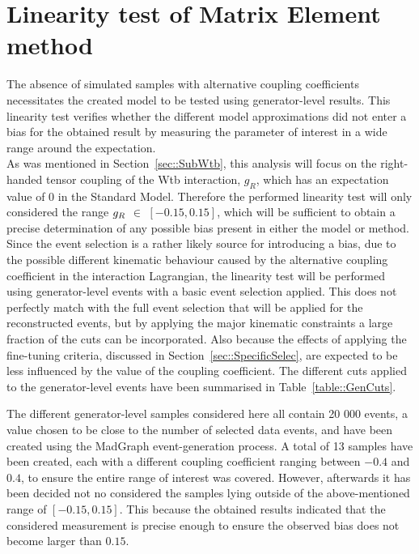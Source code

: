 \section{Linearity test of Matrix Element method}\label{sec::CalibCurve}

The absence of simulated samples with alternative coupling coefficients necessitates the created model to be tested using generator-level results. This linearity test verifies whether the different model approximations did not enter a bias for the obtained result by measuring the parameter of interest in a wide range around the expectation.
\\
As was mentioned in Section~\ref{sec::SubWtb}, this analysis will focus on the right-handed tensor coupling of the Wtb interaction, $g_{R}$, which has an expectation value of $0$ in the Standard Model. Therefore the performed linearity test will only considered the range $g_{R}$ $\in$ $\left[-0.15, 0.15\right]$, which will be sufficient to obtain a precise determination of any possible bias present in either the model or method.
\\

Since the event selection is a rather likely source for introducing a bias, due to the possible different kinematic behaviour caused by the alternative coupling coefficient in the interaction Lagrangian, the linearity test will be performed using generator-level events with a basic event selection applied.
This does not perfectly match with the full event selection that will be applied for the reconstructed events, but by applying the major kinematic constraints a large fraction of the cuts can be incorporated. Also because the effects of applying the fine-tuning criteria, discussed in Section~\ref{sec::SpecificSelec}, are expected to be less influenced by the value of the coupling coefficient. The different cuts applied to the generator-level events have been summarised in Table~\ref{table::GenCuts}.


The different generator-level samples considered here all contain 20 000 events, a value chosen to be close to the number of selected data events, and have been created using the MadGraph event-generation process. A total of 13 samples have been created, each with a different coupling coefficient ranging between $-0.4$ and $0.4$, to ensure the entire range of interest was covered. 
However, afterwards it has been decided not no considered the samples lying outside of the above-mentioned range of $\left[-0.15, 0.15\right]$. This because the obtained results indicated that the considered measurement is precise enough to ensure the observed bias does not become larger than $0.15$.
\\

